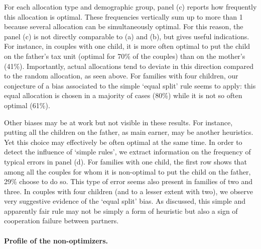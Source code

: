 \medskip
For each allocation type and demographic group, panel (c) reports how frequently this allocation is optimal. These frequencies vertically sum up to more than 1 because several allocation can be simultaneously optimal. For this reason, the panel (c) is not directly comparable to (a) and (b), but gives useful indications. For instance, in couples with one child, it is more often optimal to put the child on the father’s tax unit (optimal for 70\% of the couples) than on the mother’s (41\%). Importantly, actual allocations tend to deviate in this direction compared to the random allocation, as seen above. For families with four children, our conjecture of a bias associated to the simple ‘equal split’ rule seems to apply: this equal allocation is chosen in a majority of cases (80\%) while it is not so often optimal (61\%).


\medskip
Other biases may be at work but not visible in these results. For instance, putting all the children on the father, as main earner, may be another heuristics. Yet this choice may effectively be often optimal at the same time. In order to detect the influence of ‘simple rules’, we extract information on the frequency of typical errors in panel (d). For families with one child, the first row shows that among all the couples for whom it is non-optimal to put the child on the father, 29\% choose to do so. This type of error seems also present in families of two and three. In couples with four children (and to a lesser extent with two), we observe very suggestive evidence of the `equal split’ bias. As discussed, this simple and apparently fair rule may not be simply a form of heuristic but also a sign of cooperation failure between partners.


\medskip
\paragraph{Profile of the non-optimizers. }

